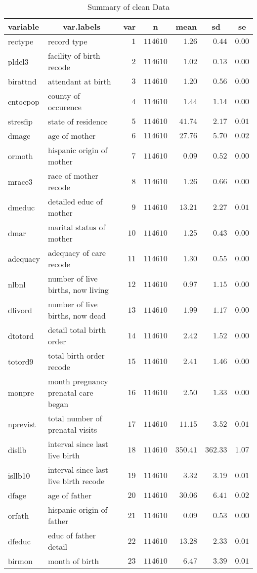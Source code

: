 %
\begin{table}[!tbp]
\footnotesize
\caption{Summary of clean Data\label{variable}} 
\begin{center}
\begin{tabular}{|l|l|r|r|r|r|r|}
\hline\hline
\multicolumn{1}{|l|}{variable}&\multicolumn{1}{c|}{var.labels}&\multicolumn{1}{c|}{var}&\multicolumn{1}{c|}{n}&\multicolumn{1}{c|}{mean}&\multicolumn{1}{c|}{sd}&\multicolumn{1}{c|}{se}\tabularnewline
\hline
rectype&record type&$ 1$&$114610$&$   1.26$&$  0.44$&$0.00$\tabularnewline
pldel3&facility of birth recode&$ 2$&$114610$&$   1.02$&$  0.13$&$0.00$\tabularnewline
birattnd&attendant at birth&$ 3$&$114610$&$   1.20$&$  0.56$&$0.00$\tabularnewline
cntocpop&county of occurence&$ 4$&$114610$&$   1.44$&$  1.14$&$0.00$\tabularnewline
stresfip&state of residence&$ 5$&$114610$&$  41.74$&$  2.17$&$0.01$\tabularnewline
dmage&age of mother&$ 6$&$114610$&$  27.76$&$  5.70$&$0.02$\tabularnewline
ormoth&hispanic origin of mother&$ 7$&$114610$&$   0.09$&$  0.52$&$0.00$\tabularnewline
mrace3&race of mother recode&$ 8$&$114610$&$   1.26$&$  0.66$&$0.00$\tabularnewline
dmeduc&detailed educ of mother&$ 9$&$114610$&$  13.21$&$  2.27$&$0.01$\tabularnewline
dmar&marital status of mother&$10$&$114610$&$   1.25$&$  0.43$&$0.00$\tabularnewline
adequacy&adequacy of care recode&$11$&$114610$&$   1.30$&$  0.55$&$0.00$\tabularnewline
nlbnl&number of live births, now living&$12$&$114610$&$   0.97$&$  1.15$&$0.00$\tabularnewline
dlivord&number of live births, now dead&$13$&$114610$&$   1.99$&$  1.17$&$0.00$\tabularnewline
dtotord&detail total birth order&$14$&$114610$&$   2.42$&$  1.52$&$0.00$\tabularnewline
totord9&total birth order recode&$15$&$114610$&$   2.41$&$  1.46$&$0.00$\tabularnewline
monpre&month pregnancy prenatal care began&$16$&$114610$&$   2.50$&$  1.33$&$0.00$\tabularnewline
nprevist&total number of prenatal visits&$17$&$114610$&$  11.15$&$  3.52$&$0.01$\tabularnewline
disllb&interval since last live birth&$18$&$114610$&$ 350.41$&$362.33$&$1.07$\tabularnewline
isllb10&interval since last live birth recode&$19$&$114610$&$   3.32$&$  3.19$&$0.01$\tabularnewline
dfage&age of father&$20$&$114610$&$  30.06$&$  6.41$&$0.02$\tabularnewline
orfath&hispanic origin of father&$21$&$114610$&$   0.09$&$  0.53$&$0.00$\tabularnewline
dfeduc&educ of father detail&$22$&$114610$&$  13.28$&$  2.33$&$0.01$\tabularnewline
birmon&month of birth&$23$&$114610$&$   6.47$&$  3.39$&$0.01$\tabularnewline

\end{tabular}
\end{center}
\end{table}
